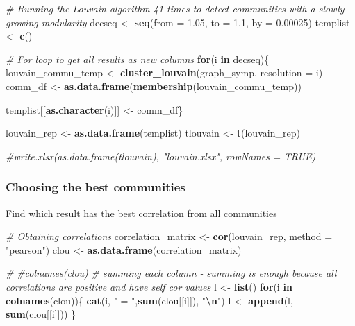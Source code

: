 \documentclass[
]{article}
\newenvironment{Shaded}{\begin{snugshade}}{\end{snugshade}}
\newcommand{\AttributeTok}[1]{\textcolor[rgb]{0.13,0.29,0.53}{#1}}
\newcommand{\CommentTok}[1]{\textcolor[rgb]{0.56,0.35,0.01}{\textit{#1}}}
\newcommand{\ControlFlowTok}[1]{\textcolor[rgb]{0.13,0.29,0.53}{\textbf{#1}}}
\newcommand{\FloatTok}[1]{\textcolor[rgb]{0.00,0.00,0.81}{#1}}
\newcommand{\FunctionTok}[1]{\textcolor[rgb]{0.13,0.29,0.53}{\textbf{#1}}}
\newcommand{\NormalTok}[1]{#1}
\newcommand{\OtherTok}[1]{\textcolor[rgb]{0.56,0.35,0.01}{#1}}
\newcommand{\SpecialCharTok}[1]{\textcolor[rgb]{0.81,0.36,0.00}{\textbf{#1}}}
\newcommand{\StringTok}[1]{\textcolor[rgb]{0.31,0.60,0.02}{#1}}
\begin{document}
\begin{Shaded}
\begin{Highlighting}[]
\CommentTok{\# Running the Louvain algorithm 41 times to detect communities with a slowly growing modularity}
\NormalTok{decseq }\OtherTok{\textless{}{-}} \FunctionTok{seq}\NormalTok{(}\AttributeTok{from =} \FloatTok{1.05}\NormalTok{, }\AttributeTok{to =} \FloatTok{1.1}\NormalTok{, }\AttributeTok{by =} \FloatTok{0.00025}\NormalTok{)}
\NormalTok{templist }\OtherTok{\textless{}{-}} \FunctionTok{c}\NormalTok{()}

\CommentTok{\# For loop to get all results as new columns}
\ControlFlowTok{for}\NormalTok{(i }\ControlFlowTok{in}\NormalTok{ decseq)\{}
\NormalTok{  louvain\_commu\_temp }\OtherTok{\textless{}{-}} \FunctionTok{cluster\_louvain}\NormalTok{(graph\_symp, }\AttributeTok{resolution =}\NormalTok{ i)}
\NormalTok{  comm\_df }\OtherTok{\textless{}{-}} \FunctionTok{as.data.frame}\NormalTok{(}\FunctionTok{membership}\NormalTok{(louvain\_commu\_temp))}
  
\NormalTok{  templist[[}\FunctionTok{as.character}\NormalTok{(i)]] }\OtherTok{\textless{}{-}}\NormalTok{ comm\_df\}}

\NormalTok{louvain\_rep }\OtherTok{\textless{}{-}} \FunctionTok{as.data.frame}\NormalTok{(templist)}
\NormalTok{tlouvain }\OtherTok{\textless{}{-}} \FunctionTok{t}\NormalTok{(louvain\_rep)}


\CommentTok{\#write.xlsx(as.data.frame(tlouvain), "louvain.xlsx", rowNames = TRUE)}
\end{Highlighting}
\end{Shaded}

\subsubsection{Choosing the best
communities}\label{choosing-the-best-communities}

Find which result has the best correlation from all communities

\begin{Shaded}
\begin{Highlighting}[]
\CommentTok{\# Obtaining correlations}
\NormalTok{correlation\_matrix }\OtherTok{\textless{}{-}} \FunctionTok{cor}\NormalTok{(louvain\_rep, }\AttributeTok{method =} \StringTok{"pearson"}\NormalTok{)}
\NormalTok{clou }\OtherTok{\textless{}{-}} \FunctionTok{as.data.frame}\NormalTok{(correlation\_matrix)}

\CommentTok{\#}
\CommentTok{\#colnames(clou)}
\CommentTok{\# summing each column {-} summing is enough because all correlations are positive and have self cor values}
\NormalTok{l }\OtherTok{\textless{}{-}} \FunctionTok{list}\NormalTok{()}
\ControlFlowTok{for}\NormalTok{(i }\ControlFlowTok{in} \FunctionTok{colnames}\NormalTok{(clou))\{}
  \FunctionTok{cat}\NormalTok{(i, }\StringTok{" = "}\NormalTok{,}\FunctionTok{sum}\NormalTok{(clou[[i]]), }\StringTok{"}\SpecialCharTok{\textbackslash{}n}\StringTok{"}\NormalTok{)}
\NormalTok{  l }\OtherTok{\textless{}{-}} \FunctionTok{append}\NormalTok{(l, }\FunctionTok{sum}\NormalTok{(clou[[i]]))}
\NormalTok{\}}
\end{Highlighting}
\end{Shaded}
\end{document}
